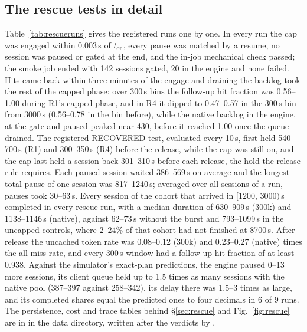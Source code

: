 \subsection{The rescue tests in detail}\label{app:rescue}
Table~\ref{tab:rescueruns} gives the registered runs one by one. In every run the cap was engaged within 0.003\,s of $t_{\mathrm{on}}$, every pause was matched by a resume, no session was paused or gated at the end, and the in-job mechanical check passed; the smoke job ended with 142 sessions gated, 20 in the engine and none failed. Hits came back within three minutes of the engage and draining the backlog took the rest of the capped phase: over 300\,s bins the follow-up hit fraction was 0.56--1.00 during R1's capped phase, and in R4 it dipped to 0.47--0.57 in the 300\,s bin from 3000\,s (0.56--0.78 in the bin before), while the native backlog in the engine, at the gate and paused peaked near 430, before it reached 1.00 once the queue drained. The registered RECOVERED test, evaluated every 10\,s, first held 540--700\,s (R1) and 300--350\,s (R4) before the release, while the cap was still on, and the cap last held a session back 301--310\,s before each release, the hold the release rule requires. Each paused session waited 386--569\,s on average and the longest total pause of one session was 817--1240\,s; averaged over all sessions of a run, pauses took 30--63\,s. Every session of the cohort that arrived in $[1200,\,3000)$\,s completed in every rescue run, with a median duration of 630--909\,s (300k) and 1138--1146\,s (native), against 62--73\,s without the burst and 793--1099\,s in the uncapped controls, where 2--24\% of that cohort had not finished at 8700\,s. After release the uncached token rate was 0.08--0.12 (300k) and 0.23--0.27 (native) times the all-miss rate, and every 300\,s window had a follow-up hit fraction of at least 0.938. Against the simulator's exact-plan predictions, the engine paused 0--13 more sessions, its client queue held up to 1.5 times as many sessions with the native pool (387--397 against 258--342), its delay there was 1.5--3 times as large, and its completed shares equal the predicted ones to four decimals in 6 of 9 runs. The persistence, cost and trace tables behind \S\ref{sec:rescue} and Fig.~\ref{fig:rescue} are in  in the data directory, written after the verdicts by .

